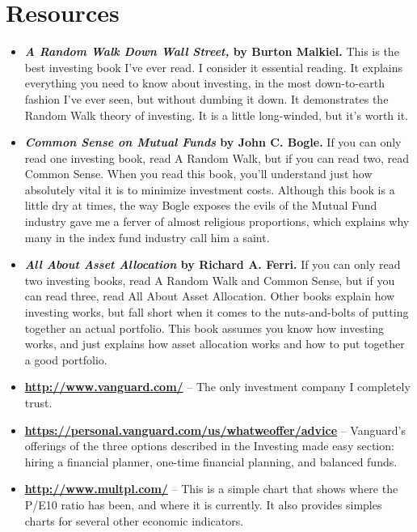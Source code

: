 \section{Resources}
\begin{itemize}
\item \textbf{\emph{A Random Walk Down Wall Street,} by Burton Malkiel.} This is the best investing book I've ever read. I consider it essential reading. It explains everything you need to know about investing, in the most down-to-earth fashion I've ever seen, but without dumbing it down. It demonstrates the Random Walk theory of investing. It is a little long-winded, but it's worth it.
\item \textbf{\emph{Common Sense on Mutual Funds} by John C. Bogle.} If you can only read one investing book, read A Random Walk, but if you can read two, read Common Sense. When you read this book, you'll understand just how absolutely vital it is to minimize investment costs. Although this book is a little dry at times, the way Bogle exposes the evils of the Mutual Fund industry gave me a ferver of almost religious proportions, which explains why many in the index fund industry call him a saint.

\item \textbf{\emph{All About Asset Allocation} by Richard A. Ferri.} If you can only read two investing books, read A Random Walk and Common Sense, but if you can read three, read All About Asset Allocation. Other books explain how investing works, but fall short when it comes to the nuts-and-bolts of putting together an actual portfolio. This book assumes you know how investing works, and just explains how asset allocation works and how to put together a good portfolio.

\item \textbf{\url{http://www.vanguard.com/}} -- The only investment company I completely trust.

\item \textbf{\url{https://personal.vanguard.com/us/whatweoffer/advice}} -- Vanguard's offerings of the three options described in the Investing made easy section: hiring a financial planner, one-time financial planning, and balanced funds.

\item \textbf{\url{http://www.multpl.com/}} -- This is a simple chart that shows where the P/E10 ratio has been, and where it is currently. It also provides simples charts for several other economic indicators. 
\end{itemize}
